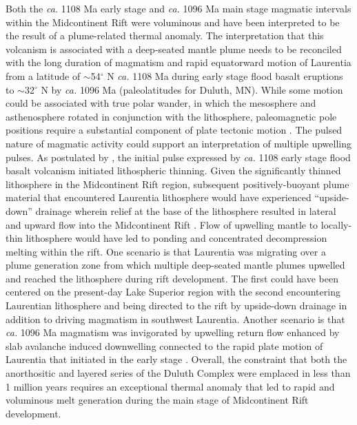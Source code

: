 \documentclass[11pt,letterpaper]{article}
\begin{document}
Both the \textit{ca.} 1108 Ma early stage and \textit{ca.} 1096 Ma main stage magmatic intervals within the Midcontinent Rift were voluminous and have been interpreted to be the result of a plume-related thermal anomaly. The interpretation that this volcanism is associated with a deep-seated mantle plume needs to be reconciled with the long duration of magmatism and rapid equatorward motion of Laurentia from a latitude of $\sim$54$^{\circ}$ N \textit{ca.} 1108 Ma during early stage flood basalt eruptions to $\sim$32$^{\circ}$ N by \textit{ca.} 1096 Ma (paleolatitudes for Duluth, MN). While some motion could be associated with true polar wander, in which the mesosphere and asthenosphere rotated in conjunction with the lithosphere,  paleomagnetic pole positions require a substantial component of plate tectonic motion \citep{Swanson-Hysell2019a}. The pulsed nature of magmatic activity could support an interpretation of multiple upwelling pulses. As postulated by \cite{Cannon1992a}, the initial pulse expressed by \textit{ca.} 1108 early stage flood basalt volcanism initiated lithospheric thinning. Given the significantly thinned lithosphere in the Midcontinent Rift region, subsequent positively-buoyant plume material that encountered Laurentia lithosphere would have experienced ``upside-down'' drainage wherein relief at the base of the lithosphere resulted in lateral and upward flow into the Midcontinent Rift \citep{Sleep1997a, Swanson-Hysell2014b}. Flow of upwelling mantle to locally-thin lithosphere would have led to ponding and concentrated decompression melting within the rift. One scenario is that Laurentia was migrating over a plume generation zone \citep{Burke2008a} from which multiple deep-seated mantle plumes upwelled and reached the lithosphere during rift development. The first could have been centered on the present-day Lake Superior region with the second encountering Laurentian lithosphere and being directed to the rift by upside-down drainage in addition to driving magmatism in southwest Laurentia. Another scenario is that \textit{ca.} 1096 Ma magmatism was invigorated by upwelling return flow enhanced by slab avalanche induced downwelling connected to the rapid plate motion of Laurentia that initiated in the early stage \citep{Swanson-Hysell2019a}. Overall, the constraint that both the anorthositic and layered series of the Duluth Complex were emplaced in less than 1 million years requires an exceptional thermal anomaly that led to rapid and voluminous melt generation during the main stage of Midcontinent Rift development.
\end{document}
